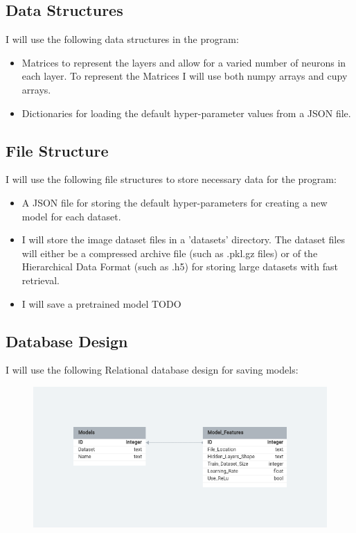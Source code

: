 \documentclass[./project-report/src/latex/project-report.tex]{subfiles}
\begin{document}
\subsection{Data Structures}

I will use the following data structures in the program:

\begin{itemize}
    \item Matrices to represent the layers and allow for a varied number of neurons in each layer. To represent the Matrices I will use both numpy arrays and cupy 
          arrays.
    \item Dictionaries for loading the default hyper-parameter values from a JSON file.
\end{itemize}

\subsection{File Structure}

I will use the following file structures to store necessary data for the program:

\begin{itemize}
    \item A JSON file for storing the default hyper-parameters for creating a new model for each dataset.
    \item I will store the image dataset files in a 'datasets' directory. The dataset files will either be a compressed archive file (such as .pkl.gz files) or of the 
          Hierarchical Data Format (such as .h5) for storing large datasets with fast retrieval.
    \item I will save a pretrained model TODO
\end{itemize}

\subsection{Database Design}

I will use the following Relational database design for saving models:

\begin{figure}[h!]
\centering
\includegraphics[width=1\textwidth]{./project-report/src/images/database-design.png}
\end{figure}
\end{document}
